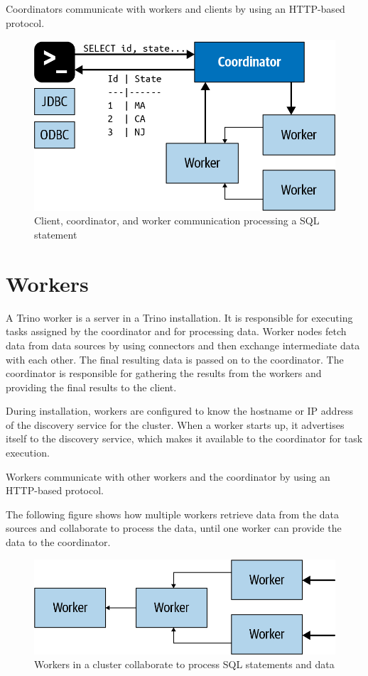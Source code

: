Coordinators communicate with workers and clients by using an HTTP-based protocol.

\begin{figure}[htbp]
\centering
\includegraphics[width=\linewidth]{images/trino_communication_processing.png}
\caption{Client, coordinator, and worker communication processing a SQL statement}\label{fig:trino-communication-precessing}
\end{figure}

\section{Workers}
A Trino worker is a server in a Trino installation. It is responsible for executing tasks assigned by the coordinator and for processing data. Worker nodes fetch data from data sources by using connectors and then exchange intermediate data with each other. The final resulting data is passed on to the coordinator. The coordinator is responsible for gathering the results from the workers and providing the final results to the client.

During installation, workers are configured to know the hostname or IP address of the discovery service for the cluster. When a worker starts up, it advertises itself to the discovery service, which makes it available to the coordinator for task execution.

Workers communicate with other workers and the coordinator by using an HTTP-based protocol.

The following figure shows how multiple workers retrieve data from the data sources and collaborate to process the data, until one worker can provide the data to the coordinator.

\begin{figure}[htbp]
\centering
\includegraphics[width=\linewidth]{images/trino_workers.png}
\caption{Workers in a cluster collaborate to process SQL statements and data}\label{fig:trino-workers}
\end{figure}

